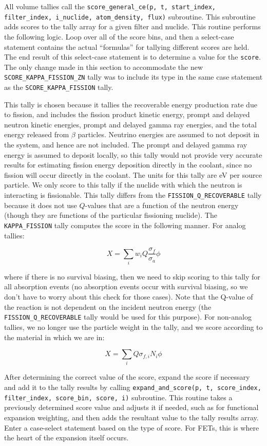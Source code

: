 \documentclass[10pt]{article}
\newcommand{\beq}{\begin{equation}}
\newcommand{\eeq}{\end{equation}}
\numberwithin{equation}{section} %
\begin{document}
All volume tallies call the {\tt score\_general\_ce(p, t, start\_index, filter\_index, i\_nuclide, atom\_density, flux)} subroutine. This subroutine adds scores to the tally array for a given filter and nuclide. This routine performs the following logic. Loop over all of the score bins, and then a select-case statement contains the actual ``formulas'' for tallying different scores are held. The end result of this select-case statement is to determine a value for the {\tt score}. The only change made in this section to accommodate the new {\tt SCORE\_KAPPA\_FISSION\_ZN} tally was to include its type in the same case statement as the {\tt SCORE\_KAPPA\_FISSION} tally. 

This tally is chosen because it tallies the recoverable energy production rate due to fission, and includes the fission product kinetic energy, prompt and delayed neutron kinetic energies, prompt and delayed gamma ray energies, and the total energy released from \(\beta\) particles. Neutrino energies are assumed to not deposit in the system, and hence are not included. The prompt and delayed gamma ray energy is assumed to deposit locally, so this tally would not provide very accurate results for estimating fission energy deposition directly in the coolant, since no fission will occur directly in the coolant. The units for this tally are eV per source particle. We only score to this tally if the nuclide with which the neutron is interacting is fissionable. This tally differs from the {\tt FISSION\_Q\_RECOVERABLE} tally because it does not use \(Q\)-values that are a function of the neutron energy (though they are functions of the particular fissioning nuclide). The {\tt KAPPA\_FISSION} tally computes the score in the following manner. For analog tallies:

\beq
X=\sum_{i}w_iQ\frac{\sigma_f}{\sigma_a}\phi
\eeq

where if there is no survival biasing, then we need to skip scoring to this tally for all absorption events (no absorption events occur with survival biasing, so we don't have to worry about this check for those cases). Note that the Q-value of the reaction is not dependent on the incident neutron energy (the {\tt FISSION\_Q\_RECOVERABLE} tally would be used for this purpose). For non-analog tallies, we no longer use the particle weight in the tally, and we score according to the material in which we are in:

\beq
X=\sum_{i}Q\sigma_{f,i}N_i\phi
\eeq

After determining the correct value of the score, expand the score if necessary and add it to the tally results by calling {\tt expand\_and\_score(p, t, score\_index, filter\_index, score\_bin, score, i)} subroutine. This routine takes a previously determined score value and adjusts it if needed, such as for functional expansion weighting, and then adds the resultant value to the tally results array. Enter a case-select statement based on the type of score. For FETs, this is where the heart of the expansion itself occurs. 
\end{document}
